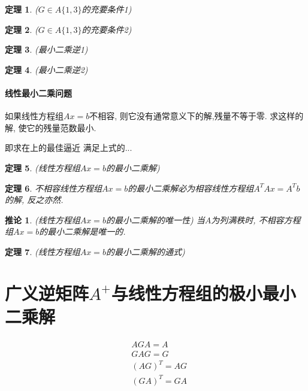 \documentclass[twoside]{article}
\newtheorem{theorem}{定理}[section]
\newtheorem{corollary}{推论}[section]
\begin{document}
\begin{theorem}
($G\in A\{1,3\}$的充要条件1)
\end{theorem}

\begin{theorem}
($G\in A\{1,3\}$的充要条件2)
\end{theorem}

\begin{theorem}
(最小二乘逆1)
\end{theorem}

\begin{theorem}
(最小二乘逆2)
\end{theorem}

\paragraph{线性最小二乘问题}
如果线性方程组$Ax=b$不相容, 则它没有通常意义下的解,残量不等于零. 求这样的解, 使它的残量范数最小.

即求在上的最佳逼近
满足上式的...

\begin{theorem}
(线性方程组$Ax=b$的最小二乘解)
\end{theorem}

\begin{theorem}
不相容线性方程组$Ax=b$的最小二乘解必为相容线性方程组$A^T Ax=A^T b$的解, 反之亦然.
\end{theorem}

\begin{corollary}
(线性方程组$Ax=b$的最小二乘解的唯一性)
当$A$为列满秩时, 不相容方程组$Ax=b$的最小二乘解是唯一的.
\end{corollary}

\begin{theorem}
(线性方程组$Ax=b$的最小二乘解的通式)
\end{theorem}

\section{广义逆矩阵$A^+$与线性方程组的极小最小二乘解}
\begin{equation*}
    \begin{aligned}
        & AGA = A \\
        & GAG = G \\
        & (AG)^T = AG \\
        & (GA)^T = GA
    \end{aligned}
\end{equation*}
\end{document}
